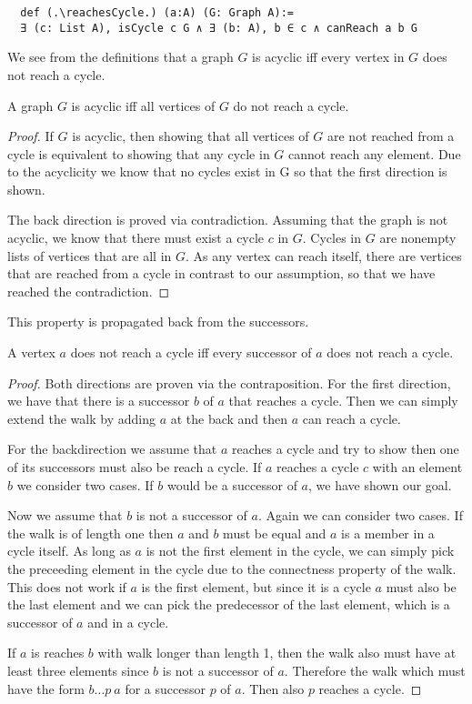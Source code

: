 \begin{lstlisting}
  def (.\reachesCycle.) (a:A) (G: Graph A):= 
  ∃ (c: List A), isCycle c G ∧ ∃ (b: A), b ∈ c ∧ canReach a b G
\end{lstlisting}

We see from the definitions that a graph $G$ is acyclic iff every vertex in $G$ does not reach a cycle. 


\begin{lemma}[\acyclicIffAllNotReachCycle]\label{lem:acyclicIffAllNotReachCycle}
  A graph $G$ is acyclic iff all vertices of $G$ do not reach a cycle.
\end{lemma}
\begin{proof}
  If $G$ is acyclic, then showing that all vertices of $G$ are not reached from a cycle is equivalent to showing that any cycle in $G$ cannot reach any element. Due to the acyclicity we know that no cycles exist in G so that the first direction is shown.

  The back direction is proved via contradiction. Assuming that the graph is not acyclic, we know that there must exist a cycle $c$ in $G$. Cycles in $G$ are nonempty lists of vertices that are all in $G$. As any vertex can reach itself, there are vertices that are reached from a cycle in contrast to our assumption, so that we have reached the contradiction.
\end{proof}

This property is propagated back from the successors.

\begin{lemma}[\NotreachesCycleIffSuccessorsNotReachCycle]
  A vertex $a$ does not reach a cycle iff every successor of $a$ does not reach a cycle.
\end{lemma}
\begin{proof}
  Both directions are proven via the contraposition. For the first direction, we have that there is a successor $b$ of $a$ that reaches a cycle. Then we can simply extend the walk by adding $a$ at the back and then $a$ can reach a cycle.

  For the backdirection we assume that $a$ reaches a cycle and try to show then one of its successors must also be reach a cycle. 
  If $a$ reaches a cycle $c$ with an element $b$ we consider two cases. 
  If $b$ would be a successor of $a$, we have shown our goal.
  
  Now we assume that $b$ is not a successor of $a$. Again we can consider two cases. If the walk is of length one then $a$ and $b$ must be equal and $a$ is a member in a cycle itself. As long as $a$ is not the first element in the cycle, we can simply pick the preceeding element in the cycle due to the connectness property of the walk. This does not work if $a$ is the first element, but since it is a cycle $a$ must also be the last element and we can pick the predecessor of the last element, which is a successor of $a$ and in a cycle.

  If $a$ is reaches $b$ with walk longer than length 1, then the walk also must have at least three elements since $b$ is not a successor of $a$. Therefore the walk which must have the form $b \dots p\ a$ for a successor $p$ of $a$. Then also $p$ reaches a cycle.
\end{proof}

